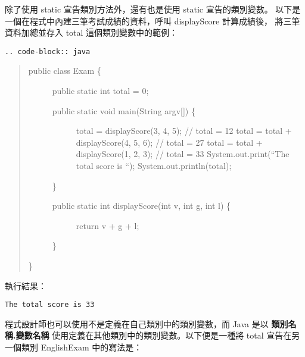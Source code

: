 \documentclass[a4paper,12pt,english]{sphinxmanual}
\begin{document}
除了使用 static 宣告類別方法外，還有也是使用 static 宣告的類別變數。
以下是一個在程式中內建三筆考試成績的資料，呼叫 displayScore 計算成績後，
將三筆資料加總並存入 total 這個類別變數中的範例：

\begin{Verbatim}[commandchars=@\[\]]
.. code-block:: java
\end{Verbatim}
\begin{quote}
\begin{description}
\item[{public class Exam \{}] \leavevmode
public static int total = 0;
\begin{description}
\item[{public static void main(String argv{[}{]}) \{}] \leavevmode
total = displayScore(3, 4, 5); // total = 12
total = total + displayScore(4, 5, 6);          // total = 27
total = total + displayScore(1, 2, 3);          // total = 33
System.out.print(``The total score is ``);
System.out.println(total);

\end{description}

\}
\begin{description}
\item[{public static int displayScore(int v, int g, int l) \{}] \leavevmode
return v + g + l;

\end{description}

\}

\end{description}

\}
\end{quote}

執行結果：

\begin{Verbatim}[commandchars=@\[\]]
The total score is 33
\end{Verbatim}

程式設計師也可以使用不是定義在自己類別中的類別變數，而 Java 是以 \textbf{類別名稱.變數名稱}
使用定義在其他類別中的類別變數。以下便是一種將 total 宣告在另一個類別 EnglishExam 中的寫法是：
\end{document}
